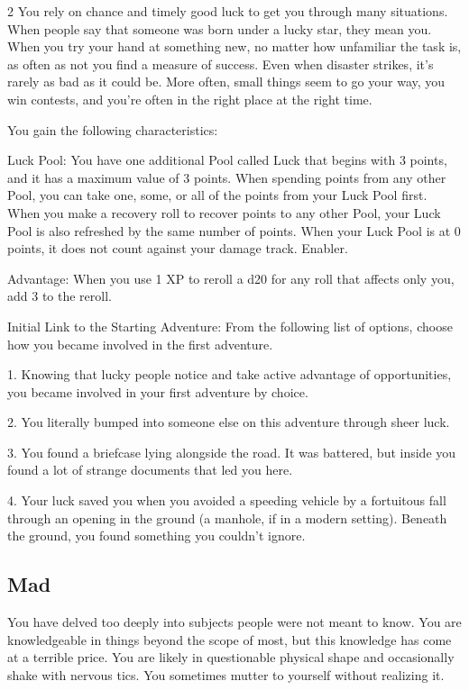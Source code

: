 \begin{multicols}{2}
You rely on chance and timely good luck to get you through many situations. When people say that someone was born under a lucky star, they mean you. When you try your hand at something new, no matter how unfamiliar the task is, as often as not you find a measure of success. Even when disaster strikes, it’s rarely as bad as it could be. More often, small things seem to go your way, you win contests, and you’re often in the right place at the right time.

You gain the following characteristics:

Luck Pool: You have one additional Pool called Luck that begins with 3 points, and it has a maximum value of 3 points. When spending points from any other Pool, you can take one, some, or all of the points from your Luck Pool first. When you make a recovery roll to recover points to any other Pool, your Luck Pool is also refreshed by the same number of points. When your Luck Pool is at 0 points, it does not count against your damage track. Enabler.

Advantage: When you use 1 XP to reroll a d20 for any roll that affects only you, add 3 to the reroll.

Initial Link to the Starting Adventure: From the following list of options, choose how you became involved in the first adventure.

1. Knowing that lucky people notice and take active advantage of opportunities, you became involved in your first adventure by choice.

2. You literally bumped into someone else on this adventure through sheer luck.

3. You found a briefcase lying alongside the road. It was battered, but inside you found a lot of strange documents that led you here.

4. Your luck saved you when you avoided a speeding vehicle by a fortuitous fall through an opening in the ground (a manhole, if in a modern setting). Beneath the ground, you found something you couldn’t ignore.

\subsection{Mad}

You have delved too deeply into subjects people were not meant to know. You are knowledgeable in things beyond the scope of most, but this knowledge has come at a terrible price. You are likely in questionable physical shape and occasionally shake with nervous tics. You sometimes mutter to yourself without realizing it.


\end{multicols}
